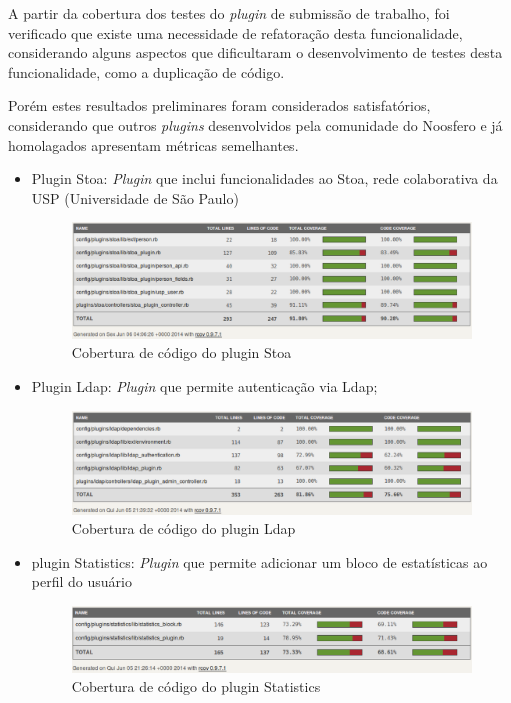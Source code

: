 A partir da cobertura dos testes do \textit{plugin} de submissão de trabalho, foi verificado que existe uma necessidade de refatoração desta funcionalidade, considerando alguns aspectos que dificultaram o desenvolvimento de testes desta funcionalidade, como a duplicação de código.

Porém estes resultados preliminares foram considerados satisfatórios, considerando que outros \textit{plugins} desenvolvidos pela comunidade do Noosfero e já homolagados apresentam métricas semelhantes.
\begin{itemize}
\item Plugin Stoa: \textit{Plugin} que inclui funcionalidades ao Stoa, rede colaborativa da USP (Universidade de São Paulo)

\begin{figure}[!h]
    \centering
    \includegraphics[keepaspectratio=false,scale=0.45]
      {figuras/stoa.eps}
    \caption{Cobertura de código do plugin Stoa}
    \label{consideracoes_cobertura3}
\end{figure}

\item Plugin Ldap: \textit{Plugin} que permite autenticação via Ldap;

\begin{figure}[!h]
    \centering
    \includegraphics[keepaspectratio=false,scale=0.45]
      {figuras/ldap.eps}
    \caption{Cobertura de código do plugin Ldap}
    \label{consideracoes_cobertura4}
\end{figure}

\item plugin Statistics: \textit{Plugin} que permite adicionar um bloco de estatísticas ao perfil do usuário

\begin{figure}[!h]
    \centering
    \includegraphics[keepaspectratio=false,scale=0.45]
      {figuras/statistics.eps}
    \caption{Cobertura de código do plugin Statistics}
    \label{consideracoes_cobertura3}
\end{figure}

\end{itemize}

